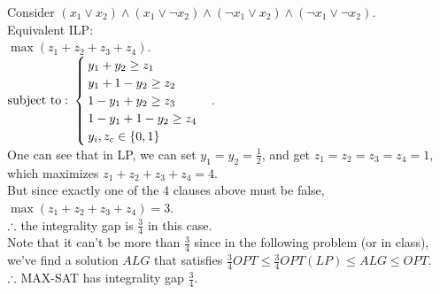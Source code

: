 \begin{pr}
Consider $(x_1\lor x_2)\land(x_1\lor\neg x_2)\land(\neg x_1\lor x_2)\land(\neg x_1\lor\neg x_2)$.\\
Equivalent ILP:\\
$\max(z_1+z_2+z_3+z_4)$.\\
$\mathrm{subject\ to:\ }\begin{cases}
y_1+y_2\geq z_1\\
y_1+1-y_2\geq z_2\\
1-y_1+y_2\geq z_3\\
1-y_1+1-y_2\geq z_4\\
y_i, z_c\in\{0, 1\}
\end{cases}$.\\
One can see that in LP, we can set $y_1=y_2=\frac12$, and get $z_1=z_2=z_3=z_4=1$, which maximizes $z_1+z_2+z_3+z_4=4$.\\
But since exactly one of the $4$ clauses above must be false, $\max(z_1+z_2+z_3+z_4)=3$.\\
$\therefore$ the integrality gap is $\frac34$ in this case.\\
Note that it can't be more than $\frac34$ since in the following problem (or in class), we've find a solution $ALG$ that satisfies $\frac34OPT\leq\frac34OPT(LP)\leq ALG\leq OPT$.\\
$\therefore$ MAX-SAT has integrality gap $\frac34$.
\end{pr}
